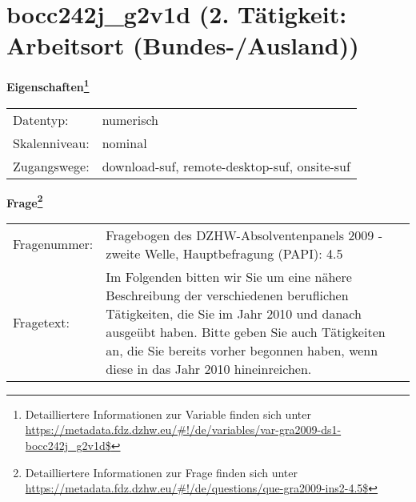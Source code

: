
    \setcounter{footnote}{0}

    \vspace*{-1.8cm}
	\section{bocc242j\_g2v1d (2. Tätigkeit: Arbeitsort (Bundes-/Ausland))}
	\label{section:bocc242j_g2v1d}



    \vspace*{0.5cm}
    \noindent\textbf{Eigenschaften\footnote{Detailliertere Informationen zur Variable finden sich unter
		\url{https://metadata.fdz.dzhw.eu/\#!/de/variables/var-gra2009-ds1-bocc242j_g2v1d$}}}\\
	\begin{tabularx}{\hsize}{@{}lX}
	Datentyp: & numerisch \\
	Skalenniveau: & nominal \\
	Zugangswege: &
	  download-suf, 
	  remote-desktop-suf, 
	  onsite-suf
 \\
    \end{tabularx}



				\vspace*{0.5cm}
                \noindent\textbf{Frage\footnote{Detailliertere Informationen zur Frage finden sich unter
		              \url{https://metadata.fdz.dzhw.eu/\#!/de/questions/que-gra2009-ins2-4.5$}}}\\
				\begin{tabularx}{\hsize}{@{}lX}
					Fragenummer: &
					  Fragebogen des DZHW-Absolventenpanels 2009 - zweite Welle, Hauptbefragung (PAPI):
					  4.5
 \\
					Fragetext: & Im Folgenden bitten wir Sie um eine nähere Beschreibung der verschiedenen beruflichen Tätigkeiten, die Sie im Jahr 2010 und danach ausgeübt haben. Bitte geben Sie auch Tätigkeiten an, die Sie bereits vorher begonnen haben, wenn diese in das Jahr 2010 hineinreichen. \\
				\end{tabularx}





